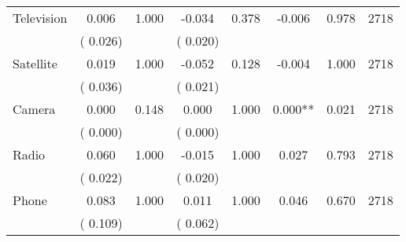 \begin{tabular}{l*{7}{c}}
 Television       &              0.006       &        1.000  &             -0.034       &        0.378  &             -0.006       &              0.978 &  2718 \\ 
                       &       (       0.026)             &                               &       (       0.020)                     &                               &                                               &                                &                      \\ 

 Satellite       &              0.019       &        1.000  &             -0.052       &        0.128  &             -0.004       &              1.000 &  2718 \\ 
                       &       (       0.036)             &                               &       (       0.021)                     &                               &                                               &                                &                      \\ 

 Camera       &              0.000       &        0.148  &              0.000       &        1.000  &              0.000**       &              0.021 &  2718 \\ 
                       &       (       0.000)             &                               &       (       0.000)                     &                               &                                               &                                &                      \\ 

 Radio       &              0.060       &        1.000  &             -0.015       &        1.000  &              0.027       &              0.793 &  2718 \\ 
                       &       (       0.022)             &                               &       (       0.020)                     &                               &                                               &                                &                      \\ 

 Phone       &              0.083       &        1.000  &              0.011       &        1.000  &              0.046       &              0.670 &  2718 \\ 
                       &       (       0.109)             &                               &       (       0.062)                     &                               &                                               &                                &                      \\ 


\end{tabular}

